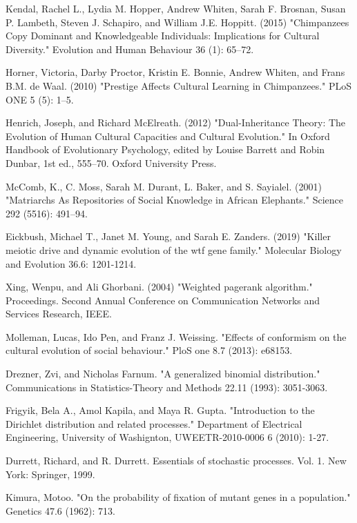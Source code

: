 \documentclass[12pt]{extarticle}
\begin{document}
\begin{thebibliography}{}
Kendal, Rachel L., Lydia M. Hopper, Andrew Whiten, Sarah F. Brosnan, Susan P. Lambeth, Steven J. Schapiro, and William J.E. Hoppitt. (2015) "Chimpanzees Copy Dominant and Knowledgeable Individuals: Implications for Cultural Diversity." Evolution and Human Behaviour 36 (1): 65–72. 

Horner, Victoria, Darby Proctor, Kristin E. Bonnie, Andrew Whiten, and Frans B.M. de Waal. (2010) "Prestige Affects Cultural Learning in Chimpanzees." PLoS ONE 5 (5): 1–5. 

Henrich, Joseph, and Richard McElreath. (2012) "Dual-Inheritance Theory: The Evolution of Human Cultural Capacities and Cultural Evolution." In Oxford Handbook of Evolutionary Psychology, edited by Louise Barrett and Robin Dunbar, 1st ed., 555–70. Oxford University Press.

McComb, K., C. Moss, Sarah M. Durant, L. Baker, and S. Sayialel. (2001) "Matriarchs As Repositories of Social Knowledge in African Elephants." Science 292 (5516): 491–94. 

Eickbush, Michael T., Janet M. Young, and Sarah E. Zanders. (2019) "Killer meiotic drive and dynamic evolution of the wtf gene family." Molecular Biology and Evolution 36.6: 1201-1214.

Xing, Wenpu, and Ali Ghorbani. (2004) "Weighted pagerank algorithm." Proceedings. Second Annual Conference on Communication Networks and Services Research, IEEE.

Molleman, Lucas, Ido Pen, and Franz J. Weissing. "Effects of conformism on the cultural evolution of social behaviour." PloS one 8.7 (2013): e68153.

Drezner, Zvi, and Nicholas Farnum. "A generalized binomial distribution." Communications in Statistics-Theory and Methods 22.11 (1993): 3051-3063.

Frigyik, Bela A., Amol Kapila, and Maya R. Gupta. "Introduction to the Dirichlet distribution and related processes." Department of Electrical Engineering, University of Washignton, UWEETR-2010-0006 6 (2010): 1-27.

Durrett, Richard, and R. Durrett. Essentials of stochastic processes. Vol. 1. New York: Springer, 1999.

Kimura, Motoo. "On the probability of fixation of mutant genes in a population." Genetics 47.6 (1962): 713.


\end{thebibliography}
\end{document}
